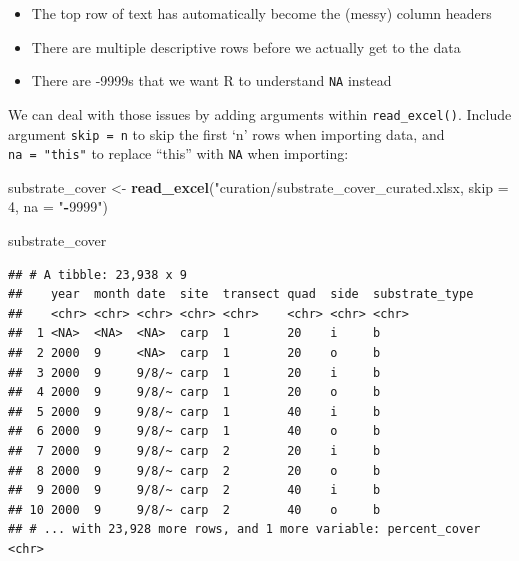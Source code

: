 \documentclass[]{book}
\newenvironment{Shaded}{\begin{snugshade}}{\end{snugshade}}
\newcommand{\DecValTok}[1]{\textcolor[rgb]{0.00,0.00,0.81}{#1}}
\newcommand{\KeywordTok}[1]{\textcolor[rgb]{0.13,0.29,0.53}{\textbf{#1}}}
\newcommand{\NormalTok}[1]{#1}
\newcommand{\OperatorTok}[1]{\textcolor[rgb]{0.81,0.36,0.00}{\textbf{#1}}}
\newcommand{\StringTok}[1]{\textcolor[rgb]{0.31,0.60,0.02}{#1}}
\providecommand{\tightlist}{%
  \setlength{\itemsep}{0pt}\setlength{\parskip}{0pt}}
\begin{document}
\begin{itemize}
\tightlist
\item
  The top row of text has automatically become the (messy) column headers
\item
  There are multiple descriptive rows before we actually get to the data
\item
  There are -9999s that we want R to understand \texttt{NA} instead
\end{itemize}

We can deal with those issues by adding arguments within \texttt{read\_excel()}. Include argument \texttt{skip\ =\ n} to skip the first `n' rows when importing data, and \texttt{na\ =\ "this"} to replace ``this'' with \texttt{NA} when importing:

\begin{Shaded}
\begin{Highlighting}[]
\NormalTok{substrate_cover <-}\StringTok{ }\KeywordTok{read_excel}\NormalTok{(}\StringTok{"curation/substrate_cover_curated.xlsx, skip = 4, na = "}\OperatorTok{-}\DecValTok{9999}\StringTok{")}
\end{Highlighting}
\end{Shaded}

\begin{Shaded}
\begin{Highlighting}[]
\NormalTok{substrate_cover}
\end{Highlighting}
\end{Shaded}

\begin{verbatim}
## # A tibble: 23,938 x 9
##    year  month date  site  transect quad  side  substrate_type
##    <chr> <chr> <chr> <chr> <chr>    <chr> <chr> <chr>         
##  1 <NA>  <NA>  <NA>  carp  1        20    i     b             
##  2 2000  9     <NA>  carp  1        20    o     b             
##  3 2000  9     9/8/~ carp  1        20    i     b             
##  4 2000  9     9/8/~ carp  1        20    o     b             
##  5 2000  9     9/8/~ carp  1        40    i     b             
##  6 2000  9     9/8/~ carp  1        40    o     b             
##  7 2000  9     9/8/~ carp  2        20    i     b             
##  8 2000  9     9/8/~ carp  2        20    o     b             
##  9 2000  9     9/8/~ carp  2        40    i     b             
## 10 2000  9     9/8/~ carp  2        40    o     b             
## # ... with 23,928 more rows, and 1 more variable: percent_cover <chr>
\end{verbatim}
\end{document}
